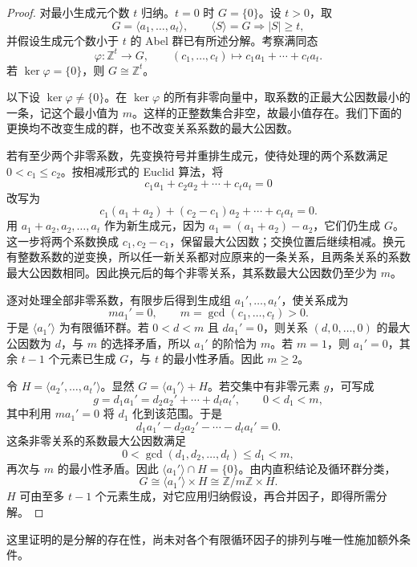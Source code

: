 \documentclass[lang=cn,a4paper,fontset=none,zihao=false,10pt,openany,twoside]{beautybook}
\numberwithin{algorithm}{chapter}
\begin{document}
\begin{proof}
对最小生成元个数 $t$ 归纳。$t=0$ 时 $G=\{0\}$。设 $t>0$，取
\[
 G=\langle a_1,\ldots,a_t\rangle,
 \qquad\langle S\rangle=G\Longrightarrow |S|\ge t,
\]
并假设生成元个数小于 $t$ 的 Abel 群已有所述分解。考察满同态
\[
 \varphi:\mathbb Z^t\longrightarrow G,
 \qquad(c_1,\ldots,c_t)\longmapsto c_1a_1+\cdots+c_ta_t.
\]
若 $\ker\varphi=\{0\}$，则 $G\cong\mathbb Z^t$。

以下设 $\ker\varphi\ne\{0\}$。在 $\ker\varphi$ 的所有非零向量中，取系数的正最大公因数最小的一条，记这个最小值为 $m$。这样的正整数集合非空，故最小值存在。我们下面的更换均不改变生成的群，也不改变关系系数的最大公因数。

若有至少两个非零系数，先变换符号并重排生成元，使待处理的两个系数满足 $0<c_1\le c_2$。按相减形式的 Euclid 算法，将
\[
 c_1a_1+c_2a_2+\cdots+c_ta_t=0
\]
改写为
\[
 c_1(a_1+a_2)+(c_2-c_1)a_2+\cdots+c_ta_t=0.
\]
用 $a_1+a_2,a_2,\ldots,a_t$ 作为新生成元，因为 $a_1=(a_1+a_2)-a_2$，它们仍生成 $G$。这一步将两个系数换成 $c_1,c_2-c_1$，保留最大公因数；交换位置后继续相减。换元有整数系数的逆变换，所以任一新关系都对应原来的一条关系，且两条关系的系数最大公因数相同。因此换元后的每个非零关系，其系数最大公因数仍至少为 $m$。

逐对处理全部非零系数，有限步后得到生成组 $a_1',\ldots,a_t'$，使关系成为
\[
 ma_1'=0,\qquad m=\gcd(c_1,\ldots,c_t)>0.
\]
于是 $\langle a_1'\rangle$ 为有限循环群。若 $0<d<m$ 且 $da_1'=0$，则关系 $(d,0,\ldots,0)$ 的最大公因数为 $d$，与 $m$ 的选择矛盾，所以 $a_1'$ 的阶恰为 $m$。若 $m=1$，则 $a_1'=0$，其余 $t-1$ 个元素已生成 $G$，与 $t$ 的最小性矛盾。因此 $m\ge2$。

令 $H=\langle a_2',\ldots,a_t'\rangle$。显然 $G=\langle a_1'\rangle+H$。若交集中有非零元素 $g$，可写成
\[
 g=d_1a_1'=d_2a_2'+\cdots+d_ta_t',\qquad 0<d_1<m,
\]
其中利用 $ma_1'=0$ 将 $d_1$ 化到该范围。于是
\[
 d_1a_1'-d_2a_2'-\cdots-d_ta_t'=0.
\]
这条非零关系的系数最大公因数满足
\[
 0<\gcd(d_1,d_2,\ldots,d_t)\le d_1<m,
\]
再次与 $m$ 的最小性矛盾。因此 $\langle a_1'\rangle\cap H=\{0\}$。由内直积结论及循环群分类，
\[
 G\cong\langle a_1'\rangle\times H
 \cong\mathbb Z/m\mathbb Z\times H.
\]
$H$ 可由至多 $t-1$ 个元素生成，对它应用归纳假设，再合并因子，即得所需分解。
\end{proof}
这里证明的是分解的存在性，尚未对各个有限循环因子的排列与唯一性施加额外条件。
\end{document}

